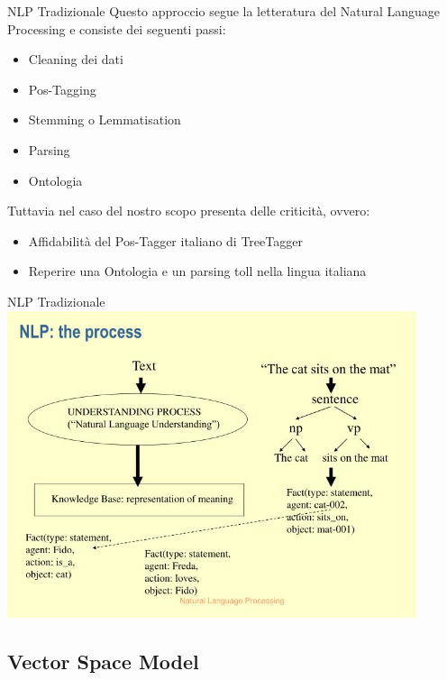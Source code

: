 \documentclass[british]{beamer}
\begin{document}
\begin{frame}{NLP Tradizionale}
	Questo approccio segue la letteratura del Natural Language Processing e consiste dei seguenti passi:
	\begin{itemize}
		\item Cleaning dei dati
		\item Pos-Tagging
		\item Stemming o Lemmatisation
		\item Parsing
		\item Ontologia
	\end{itemize}
	Tuttavia nel caso del nostro scopo presenta delle criticit\`{a}, ovvero:
	\begin{itemize}
		\item Affidabilit\`{a} del Pos-Tagger italiano di TreeTagger
		\item Reperire una Ontologia e un parsing toll nella lingua italiana
	\end{itemize}
\end{frame}

\begin{frame}{NLP Tradizionale}
	\includegraphics[width=0.9\textwidth, height=0.85\textheight]{./Imgs/nlp-the-process.jpg}
\end{frame}
	
\subsection{Vector Space Model}
	
\end{document}
